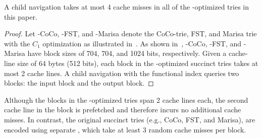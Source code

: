 
\begin{lemma}
  A child navigation takes at most 4 cache misses in all of the
  \bvdesign-optimized tries in this paper.
\end{lemma}

\begin{proof}
  Let \bvdesign-CoCo, \bvdesign-FST, and \bvdesign-Marisa denote the CoCo-trie,
  FST, and Marisa trie with the $C_1$ optimization as illustrated
  in~.  As shown in~, \bvdesign-CoCo,
  \bvdesign-FST, and \bvdesign-Marisa have block sizes of 704, 704, and 1024
  bits, respectively. Given a cache-line size of 64 bytes (512 bits), each block
  in the \bvdesign-optimized succinct tries takes at most 2 cache lines.  A
  child navigation with the functional index queries two blocks: the input block
  and the output
  block. %
\end{proof}

Although the blocks in the \bvdesign-optimized tries span 2 cache lines each,
the second cache line in the block is prefetched and therefore incurs no
additional cache misses. In contrast, the original succinct tries (e.g., CoCo,
FST, and Marisa), are encoded using separate \bvs, which take at least 3 random
cache misses per block.

